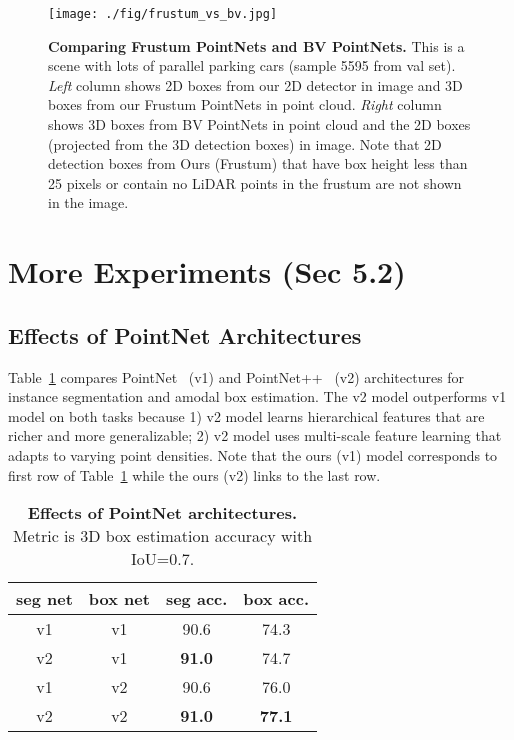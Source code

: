 \documentclass[10pt,twocolumn,letterpaper]{article}
\begin{document}
\begin{figure}[h!]
    \centering
    \texttt{[image: ./fig/frustum\_vs\_bv.jpg]}
    \caption{\textbf{Comparing Frustum PointNets and BV PointNets.} This is a scene with lots of parallel parking cars (sample 5595 from val set). \emph{Left} column shows 2D boxes from our 2D detector in image and 3D boxes from our Frustum PointNets in point cloud. \emph{Right} column shows 3D boxes from BV PointNets in point cloud and the 2D boxes (projected from the 3D detection boxes) in image. Note that 2D detection boxes from Ours (Frustum) that have box height less than 25 pixels or contain no LiDAR points in the frustum are not shown in the image.}
    \label{fig:frustum_vs_bv}
\end{figure}


\section{More Experiments (Sec 5.2)}
\label{sec:supp_more_exp}

\subsection{Effects of PointNet Architectures}
Table~\ref{tab:v1v2} compares PointNet~\cite{qi2017pointnet} (v1) and PointNet++~\cite{qi2017pointnetplusplus} (v2) architectures for instance segmentation and amodal box estimation. The v2 model outperforms v1 model on both tasks because 1) v2 model learns hierarchical features that are richer and more generalizable; 2) v2 model uses multi-scale feature learning that adapts to varying point densities. Note that the ours (v1) model corresponds to first row of Table~\ref{tab:v1v2} while the ours (v2) links to the last row.

\begin{table}[h!]
\centering
\begin{tabular}{cc|cc}
\hline
seg net & box net & seg acc. & box acc. \\ \hline
v1   & v1   & 90.6 & 74.3  \\
v2   & v1   & \textbf{91.0} & 74.7 \\
v1   & v2   & 90.6 & 76.0 \\
v2   & v2   & \textbf{91.0}  & \textbf{77.1} \\ \hline
\end{tabular}
\caption{\textbf{Effects of PointNet architectures.} Metric is 3D box estimation accuracy with IoU=0.7.}
\label{tab:v1v2}
\end{table}
\end{document}
